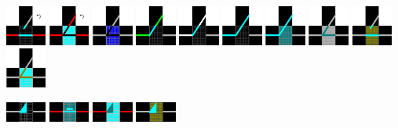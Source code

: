 \documentclass[12pt,a4paper]{article}
\begin{document}
\begin{enumerate}[leftmargin=*]
\includegraphics[width=0.1\textwidth]{symboly/vyh7.png}
\includegraphics[width=0.1\textwidth]{symboly/vyh8.png}
\includegraphics[width=0.1\textwidth]{symboly/vyh14.png}
\includegraphics[width=0.1\textwidth]{symboly/vyh21.png}
\includegraphics[width=0.1\textwidth]{symboly/vyh22.png}
\includegraphics[width=0.1\textwidth]{symboly/vyh23.png}
\includegraphics[width=0.1\textwidth]{symboly/vyh24.png}
\includegraphics[width=0.1\textwidth]{symboly/vyh25.png}
\includegraphics[width=0.1\textwidth]{symboly/vyh26.png}
\includegraphics[width=0.1\textwidth]{symboly/vyh27.png}

\includegraphics[width=0.1\textwidth]{symboly/vyk9.png}
\includegraphics[width=0.1\textwidth]{symboly/vyk10.png}
\includegraphics[width=0.1\textwidth]{symboly/vyk11.png}
\includegraphics[width=0.1\textwidth]{symboly/vyk17.png}


\end{enumerate}
\end{document}

